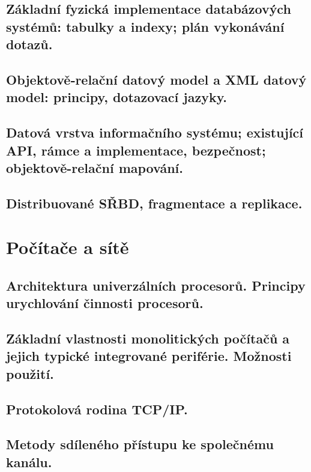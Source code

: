 \documentclass{book}
\begin{document}
\chapter{Základní fyzická implementace databázových systémů: tabulky a indexy; plán vykonávání dotazů.}

\clearpage

\chapter{Objektově‐relační datový model a XML datový model: principy, dotazovací jazyky.}

\clearpage

\chapter{Datová vrstva informačního systému; existující API, rámce a implementace, bezpečnost; objektově-relační mapování.}

\clearpage

\chapter{Distribuované SŘBD, fragmentace a replikace.}

\clearpage

\part{Počítače a sítě}
\chapter{Architektura univerzálních procesorů. Principy urychlování činnosti procesorů. }

\clearpage

\chapter{Základní vlastnosti monolitických počítačů a jejich typické integrované periférie. Možnosti použití. }

\clearpage

\chapter{Protokolová rodina TCP/IP. }

\clearpage

\chapter{Metody sdíleného přístupu ke společnému kanálu. }

\clearpage
\end{document}
